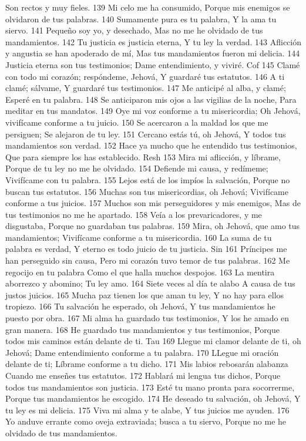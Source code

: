 Son rectos y muy fieles.
139 Mi celo me ha consumido,
Porque mis enemigos se olvidaron de tus palabras.
140 Sumamente pura es tu palabra,
Y la ama tu siervo.
141 Pequeño soy yo, y desechado,
Mas no me he olvidado de tus mandamientos.
142 Tu justicia es justicia eterna,
Y tu ley la verdad.
143 Aflicción y angustia se han apoderado de mí,
Mas tus mandamientos fueron mi delicia.
144 Justicia eterna son tus testimonios;
Dame entendimiento, y viviré.
Cof
145 Clamé con todo mi corazón; respóndeme, Jehová,
Y guardaré tus estatutos.
146 A ti clamé; sálvame,
Y guardaré tus testimonios.
147 Me anticipé al alba, y clamé;
Esperé en tu palabra.
148 Se anticiparon mis ojos a las vigilias de la noche,
Para meditar en tus mandatos.
149 Oye mi voz conforme a tu misericordia;
Oh Jehová, vivifícame conforme a tu juicio.
150 Se acercaron a la maldad los que me persiguen;
Se alejaron de tu ley.
151 Cercano estás tú, oh Jehová,
Y todos tus mandamientos son verdad.
152 Hace ya mucho que he entendido tus testimonios,
Que para siempre los has establecido.
Resh
153 Mira mi aflicción, y líbrame,
Porque de tu ley no me he olvidado.
154 Defiende mi causa, y redímeme;
Vivifícame con tu palabra.
155 Lejos está de los impíos la salvación,
Porque no buscan tus estatutos.
156 Muchas son tus misericordias, oh Jehová;
Vivifícame conforme a tus juicios.
157 Muchos son mis perseguidores y mis enemigos,
Mas de tus testimonios no me he apartado.
158 Veía a los prevaricadores, y me disgustaba,
Porque no guardaban tus palabras.
159 Mira, oh Jehová, que amo tus mandamientos;
Vivifícame conforme a tu misericordia.
160 La suma de tu palabra es verdad,
Y eterno es todo juicio de tu justicia.
Sin
161 Príncipes me han perseguido sin causa,
Pero mi corazón tuvo temor de tus palabras.
162 Me regocijo en tu palabra
Como el que halla muchos despojos.
163 La mentira aborrezco y abomino;
Tu ley amo.
164 Siete veces al día te alabo
A causa de tus justos juicios.
165 Mucha paz tienen los que aman tu ley,
Y no hay para ellos tropiezo.
166 Tu salvación he esperado, oh Jehová,
Y tus mandamientos he puesto por obra.
167 Mi alma ha guardado tus testimonios,
Y los he amado en gran manera.
168 He guardado tus mandamientos y tus testimonios,
Porque todos mis caminos están delante de ti.
Tau
169 Llegue mi clamor delante de ti, oh Jehová;
Dame entendimiento conforme a tu palabra.
170 LLegue mi oración delante de ti;
Líbrame conforme a tu dicho.
171 Mis labios rebosarán alabanza
Cuando me enseñes tus estatutos.
172 Hablará mi lengua tus dichos,
Porque todos tus mandamientos son justicia.
173 Esté tu mano pronta para socorrerme,
Porque tus mandamientos he escogido.
174 He deseado tu salvación, oh Jehová,
Y tu ley es mi delicia.
175 Viva mi alma y te alabe,
Y tus juicios me ayuden.
176 Yo anduve errante como oveja extraviada; busca a tu siervo,
Porque no me he olvidado de tus mandamientos.

